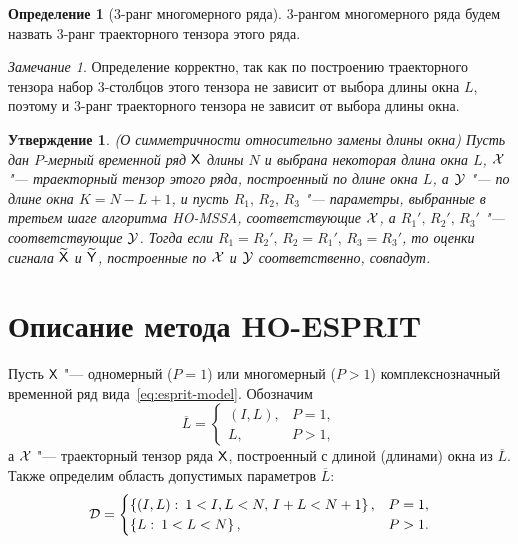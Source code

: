 \documentclass[specialist,
  substylefile=spbu_report.rtx,
subf,href,colorlinks=true, 12pt]{disser}
\theoremstyle{plain}
\newtheorem{statement}{Утверждение}[section]
\theoremstyle{definition}
\newtheorem{definition}{Определение}[section]
\theoremstyle{remark}
\newtheorem{remark}{Замечание}[section]
\begin{document}
\begin{definition}[3-ранг многомерного ряда]
  3-рангом многомерного ряда будем назвать 3-ранг траекторного
  тензора этого ряда.
\end{definition}
\begin{remark}
  Определение корректно, так как по построению траекторного тензора
  набор 3-столбцов этого тензора
  не зависит от выбора длины окна $L$, поэтому и $3$-ранг
  траекторного тензора не зависит от выбора
  длины окна.
\end{remark}

\begin{statement}
  \emph{(О симметричности относительно замены длины окна)}
  Пусть дан $P$-мерный временной ряд $\mathsf{X}$ длины $N$ и выбрана
  некоторая длина окна $L$,
  $\mathcal{X}$ "--- траекторный тензор этого ряда, построенный по длине окна $L$, а
  $\mathcal{Y}$ "--- по длине окна ${K = N - L + 1}$, и пусть
  $R_1,\, R_2,\, R_3$ "--- параметры, выбранные в третьем шаге
  алгоритма \emph{HO-MSSA}, соответствующие $\mathcal{X}$,
  а $R_1',\, R_2',\, R_3'$ "--- соответствующие $\mathcal{Y}$.
  Тогда если $R_1 = R_2',\, R_2 = R_1',\,  R_3 = R_3'$, то
  оценки сигнала $\widetilde{\mathsf{X}}$ и $\widetilde{\mathsf{Y}}$, построенные
  по $\mathcal{X}$ и $\mathcal{Y}$ соответственно,
  совпадут.
\end{statement}

\section{Описание метода HO-ESPRIT}\label{sec:Tensor-esprit-description}
Пусть $\mathsf{X}$ "--- одномерный ($P=1$) или многомерный ($P>1$)
комплекснозначный временной ряд
вида~\eqref{eq:esprit-model}.
Обозначим
\[
  \overline{L} =
  \begin{cases}
    (I, L), & P=1,\\
    L, & P>1,
  \end{cases}
\]
а $\mathcal{X}$ "--- траекторный тензор ряда $\mathsf{X}$, построенный с длиной
(длинами) окна из $\overline{L}$.
Также определим область допустимых параметров $\overline{L}$:
\[
  \mathcal{D} =
  \begin{cases}
    \left\{ (I, L):\: 1< I,L <N,\, I + L < N + 1 \right\}, & P = 1,\\
    \left\{ L:\: 1< L <N \right\}, & P > 1.
  \end{cases}
\]
\end{document}
